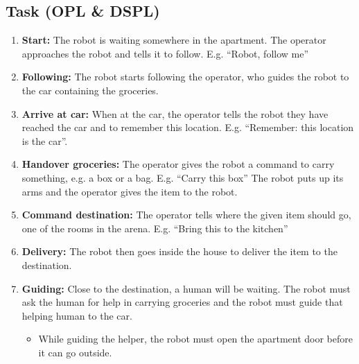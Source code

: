 \subsection{Task (OPL \& DSPL)}
\begin{enumerate}
	\item \textbf{Start:} The robot is waiting somewhere in the apartment. The operator approaches the robot and tells it to follow. E.g. ``Robot, follow me''
	\item \textbf{Following:} The robot starts following the operator, who guides the robot to the car containing the groceries. 
	\item \textbf{Arrive at car:} When at the car, the operator tells the robot they have reached the car and to remember this location. E.g. ``Remember: this location is the car''. 
	\item \textbf{Handover groceries:} The operator gives the robot a command to carry something, e.g. a box or a bag.  E.g. ``Carry this box''
	  The robot puts up its arms and the operator gives the item to the robot.
	\item \textbf{Command destination:} The operator tells where the given item should go, one of the rooms in the arena. E.g. ``Bring this to the kitchen''
	\item \textbf{Delivery:} The robot then goes inside the house to deliver the item to the destination. 
	\item \textbf{Guiding:} Close to the destination, a human will be waiting. The robot must ask the human for help in carrying groceries and the robot must guide that helping human to the car.
		\begin{itemize}
			\item While guiding the helper, the robot must open the apartment door before it can go outside.
		\end{itemize}
\end{enumerate}

